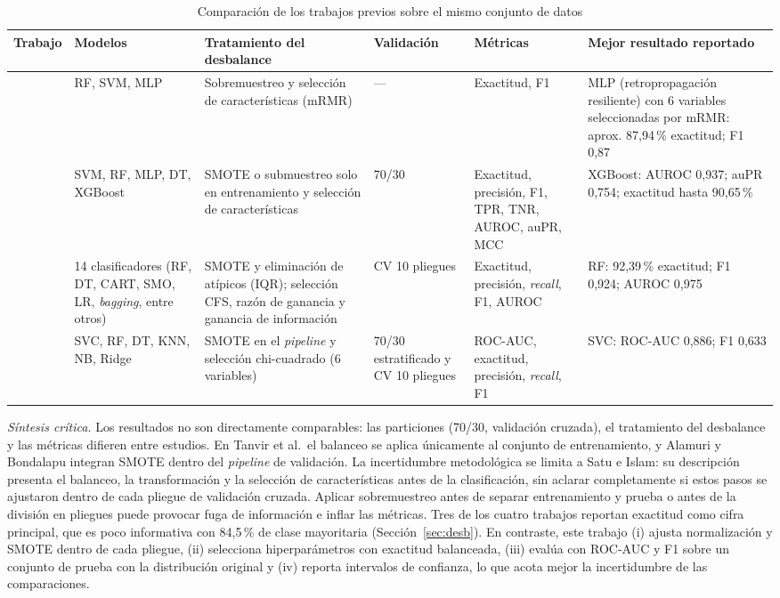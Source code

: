 \documentclass[conference]{IEEEtran}
\begin{document}
\begin{table}[!t]
\centering
\caption{Comparación de los trabajos previos sobre el mismo conjunto de datos}
\label{tab:sota}
\footnotesize
\begin{tabular}{@{}p{1.3cm}p{2.7cm}p{2.7cm}p{2.0cm}p{3.2cm}p{3.3cm}@{}}
\toprule
Trabajo & Modelos & Tratamiento del desbalance & Validación & Métricas & Mejor resultado reportado \\
\midrule
\cite{sakar2019} & RF, SVM, MLP & Sobremuestreo y selección de características (mRMR) & --- & Exactitud, F1 & MLP (retropropagación resiliente) con 6 variables seleccionadas por mRMR: aprox. 87,94\,\% exactitud; F1 0,87 \\
\cite{tanvir2023} & SVM, RF, MLP, DT, XGBoost & SMOTE o submuestreo solo en entrenamiento y selección de características & 70/30 & Exactitud, precisión, F1, TPR, TNR, AUROC, auPR, MCC & XGBoost: AUROC 0,937; auPR 0,754; exactitud hasta 90,65\,\% \\
\cite{satu2023} & 14 clasificadores (RF, DT, CART, SMO, LR, \emph{bagging}, entre otros) & SMOTE y eliminación de atípicos (IQR); selección CFS, razón de ganancia y ganancia de información & CV 10 pliegues & Exactitud, precisión, \emph{recall}, F1, AUROC & RF: 92,39\,\% exactitud; F1 0,924; AUROC 0,975 \\
\cite{alamuri2026} & SVC, RF, DT, KNN, NB, Ridge & SMOTE en el \emph{pipeline} y selección chi-cuadrado (6 variables) & 70/30 estratificado y CV 10 pliegues & ROC-AUC, exactitud, precisión, \emph{recall}, F1 & SVC: ROC-AUC 0,886; F1 0,633 \\
\bottomrule
\end{tabular}
\end{table}

\emph{Síntesis crítica.} Los resultados no son directamente comparables: las particiones (70/30, validación cruzada), el tratamiento del desbalance y las métricas difieren entre estudios. En Tanvir et al.\ el balanceo se aplica únicamente al conjunto de entrenamiento, y Alamuri y Bondalapu integran SMOTE dentro del \emph{pipeline} de validación. La incertidumbre metodológica se limita a Satu e Islam: su descripción presenta el balanceo, la transformación y la selección de características antes de la clasificación, sin aclarar completamente si estos pasos se ajustaron dentro de cada pliegue de validación cruzada. Aplicar sobremuestreo antes de separar entrenamiento y prueba o antes de la división en pliegues puede provocar fuga de información e inflar las métricas. Tres de los cuatro trabajos reportan exactitud como cifra principal, que es poco informativa con 84,5\,\% de clase mayoritaria (Sección~\ref{sec:desb}). En contraste, este trabajo (i) ajusta normalización y SMOTE dentro de cada pliegue, (ii) selecciona hiperparámetros con exactitud balanceada, (iii) evalúa con ROC-AUC y F1 sobre un conjunto de prueba con la distribución original y (iv) reporta intervalos de confianza, lo que acota mejor la incertidumbre de las comparaciones.
\end{document}
